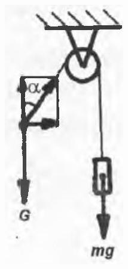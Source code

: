 \documentclass[10pt]{article}
\begin{document}
\includegraphics[max width=\textwidth, center]{2025_07_01_5b3ff9fa0d508c8e9f17g-213(2)}
\end{document}
